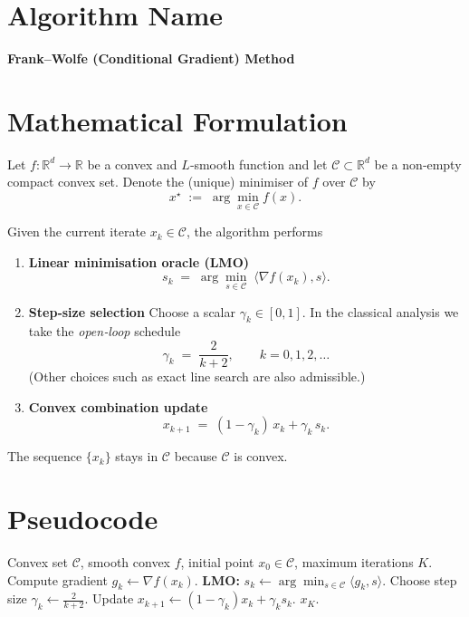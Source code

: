 \documentclass{article}
\newcommand{\R}{\mathbb{R}}
\newcommand{\Cset}{\mathcal{C}}
\newcommand{\opt}{x^{\star}}
\newcommand{\grad}{\nabla}
\newcommand{\inner}[2]{\langle #1,#2\rangle}
\begin{document}
\section*{Algorithm Name}
\textbf{Frank–Wolfe (Conditional Gradient) Method}

\section*{Mathematical Formulation}
Let $f:\R^{d}\rightarrow\R$ be a convex and $L$‑smooth function and let $\Cset\subset\R^{d}$ be a non‑empty compact convex set.  
Denote the (unique) minimiser of $f$ over $\Cset$ by
\[
\opt \;:=\; \arg\min_{x\in\Cset} f(x).
\]

Given the current iterate $x_{k}\in\Cset$, the algorithm performs

\begin{enumerate}
\item \textbf{Linear minimisation oracle (LMO)}  
\[
s_{k}\;=\;\arg\min_{s\in\Cset}\; \inner{\grad f(x_{k})}{s}.
\tag{1}
\]
\item \textbf{Step‑size selection}  
Choose a scalar $\gamma_{k}\in[0,1]$.  In the classical analysis we take the \emph{open‑loop} schedule
\[
\gamma_{k}\;=\;\frac{2}{k+2},\qquad k=0,1,2,\dots
\tag{2}
\]
(Other choices such as exact line search are also admissible.)
\item \textbf{Convex combination update}  
\[
x_{k+1}\;=\;(1-\gamma_{k})\,x_{k}+\gamma_{k}\,s_{k}.
\tag{3}
\]
\end{enumerate}

The sequence $\{x_{k}\}$ stays in $\Cset$ because $\Cset$ is convex.

\section*{Pseudocode}
\begin{algorithm}[H]
\caption{Frank–Wolfe Method}
\begin{algorithmic}[1]
\Require Convex set $\Cset$, smooth convex $f$, initial point $x_{0}\in\Cset$, maximum iterations $K$.
    \State Compute gradient $g_{k}\gets\grad f(x_{k})$.
    \State \textbf{LMO:} $s_{k}\gets\arg\min_{s\in\Cset}\inner{g_{k}}{s}$.
    \State Choose step size $\displaystyle \gamma_{k}\gets\frac{2}{k+2}$.
    \State Update $x_{k+1}\gets (1-\gamma_{k})x_{k}+\gamma_{k}s_{k}$.
\EndFor
\State \Return $x_{K}$.
\end{algorithmic}
\end{algorithm}
\end{document}
